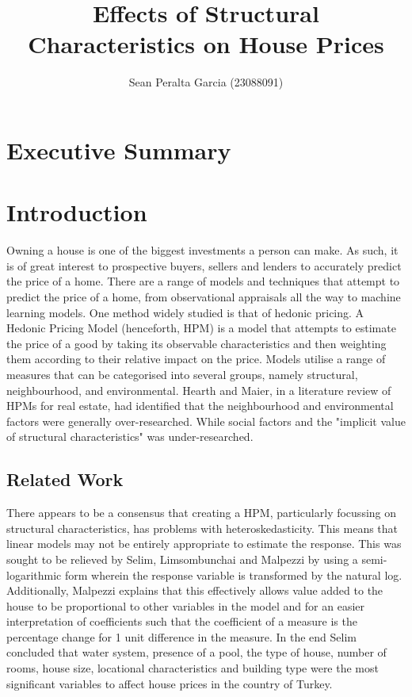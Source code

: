 \documentclass[10pt,A4,makeidx]{article}
\title
{Effects of Structural Characteristics on House Prices}
\author{Sean Peralta Garcia (23088091)}
\date {}
\begin{document}
\maketitle


\section{Executive Summary}
\section{Introduction}
  Owning a house is one of the biggest investments a person can make. As such, it 
  is of great interest to prospective buyers, sellers and lenders to accurately
  predict the price of a home. There are a range of models and techniques that 
  attempt to predict the price of a home, from observational appraisals all 
  the way to machine learning models\cite{hedonic_ai}. One method widely studied is that of
  hedonic pricing. A Hedonic Pricing Model (henceforth, HPM) is a model that 
  attempts to estimate the price of a good by taking its observable characteristics
  and then weighting them according to their relative impact on the price. Models
  utilise a range of measures that can be categorised into several groups, 
  namely structural, neighbourhood, and environmental. \cite{hedonic_rev} Hearth and Maier,
  in a literature review of HPMs for real estate, had identified that the 
  neighbourhood and environmental factors were generally over-researched. While
  social factors and the "implicit value of structural characteristics" was 
  under-researched.\cite{lit_rev}

  \subsection{Related Work}
  There appears to be a consensus that creating a HPM, particularly focussing on
  structural characteristics, has problems with heteroskedasticity. This means
  that linear models may not be entirely appropriate to estimate the response.
  This was sought to be relieved by Selim, Limsombunchai and Malpezzi by using
  a semi-logarithmic form wherein the response variable is transformed by the natural log.
  \cite{hedonic_ai, hedonic_rev, hedonic_regress} Additionally, Malpezzi explains
  that this effectively allows value added to the house to be proportional to 
  other variables in the model and for an easier interpretation of coefficients
  such that the coefficient of a measure is the percentage change for 1 unit 
  difference in the measure.\cite{hedonic_rev}
  In the end Selim concluded that water system, presence of a pool, the type of house,
  number of rooms, house size, locational characteristics and building type were
  the most significant variables to affect house prices in the country of Turkey.
  \cite{hedonic_regress}
    
\end{document}
